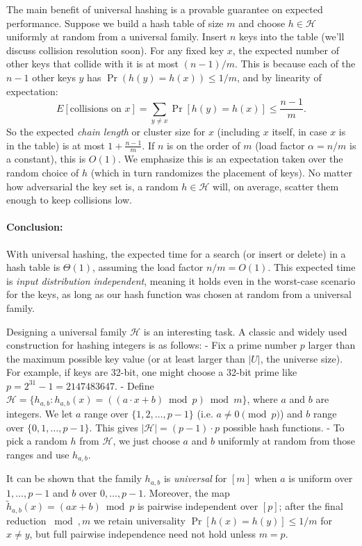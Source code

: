 \documentclass[11pt]{article}
\begin{document}
The main benefit of universal hashing is a provable guarantee on expected performance. Suppose we build a hash table of size $m$ and choose $h \in \mathcal{H}$ uniformly at random from a universal family. Insert $n$ keys into the table (we’ll discuss collision resolution soon). For any fixed key $x$, the expected number of other keys that collide with it is at most $(n-1)/m$. This is because each of the $n-1$ other keys $y$ has $\Pr(h(y)=h(x)) \le 1/m$, and by linearity of expectation:
\[ E[\text{collisions on }x] = \sum_{y \neq x} \Pr[h(y)=h(x)] \le \frac{n-1}{m}. \]
So the expected \emph{chain length} or cluster size for $x$ (including $x$ itself, in case $x$ is in the table) is at most $1 + \frac{n-1}{m}$. If $n$ is on the order of $m$ (load factor $\alpha = n/m$ is a constant), this is $O(1)$. We emphasize this is an expectation taken over the random choice of $h$ (which in turn randomizes the placement of keys). No matter how adversarial the key set is, a random $h \in \mathcal{H}$ will, on average, scatter them enough to keep collisions low.

\paragraph{Conclusion:} With universal hashing, the expected time for a search (or insert or delete) in a hash table is $\Theta(1)$, assuming the load factor $n/m = O(1)$. This expected time is \emph{input distribution independent}, meaning it holds even in the worst-case scenario for the keys, as long as our hash function was chosen at random from a universal family.

Designing a universal family $\mathcal{H}$ is an interesting task. A classic and widely used construction for hashing integers is as follows:
- Fix a prime number $p$ larger than the maximum possible key value (or at least larger than $|U|$, the universe size). For example, if keys are 32-bit, one might choose a 32-bit prime like $p = 2^{31}-1 = 2147483647$.
- Define $\mathcal{H} = \{ h_{a,b} : h_{a,b}(x) = ((a \cdot x + b) \bmod p) \bmod m \}$, where $a$ and $b$ are integers. We let $a$ range over $\{1,2,\ldots, p-1\}$ (i.e. $a \neq 0 \pmod p$) and $b$ range over $\{0,1,\ldots,p-1\}$. This gives $|\mathcal{H}| = (p-1)\cdot p$ possible hash functions.
- To pick a random $h$ from $\mathcal{H}$, we just choose $a$ and $b$ uniformly at random from those ranges and use $h_{a,b}$.

It can be shown that the family ${h_{a,b}}$ is \emph{universal} for $[m]$ when $a$ is uniform over ${1,\dots,p-1}$ and $b$ over ${0,\dots,p-1}$. Moreover, the map $\tilde h_{a,b}(x)=(ax+b)\bmod p$ is pairwise independent over $[p]$; after the final reduction $\bmod, m$ we retain universality $\Pr[h(x)=h(y)]\le 1/m$ for $x\ne y$, but full pairwise independence need not hold unless $m=p$.
\end{document}
